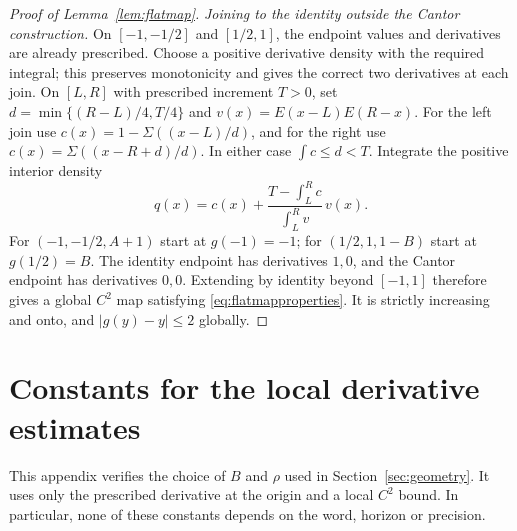 \documentclass[11pt]{amsart}
\theoremstyle{definition}
\theoremstyle{remark}
\numberwithin{equation}{section}
\begin{document}
\begin{proof}[Proof of Lemma~\ref{lem:flatmap}]
\smallskip
\emph{Joining to the identity outside the Cantor construction.}
On $[-1,-1/2]$ and $[1/2,1]$, the endpoint values and derivatives
are already prescribed. Choose a positive derivative density with
the required integral; this preserves monotonicity and gives the
correct two derivatives at each join. On $[L,R]$
with prescribed increment $T>0$, set
$d=\min\{(R-L)/4,T/4\}$ and $v(x)=E(x-L)E(R-x)$.
For the left join use $c(x)=1-\Sigma((x-L)/d)$, and for the right
use $c(x)=\Sigma((x-R+d)/d)$. In either case $\int c\le d<T$.
Integrate the positive interior density
\begin{equation}\label{eq:extensiondensity}
q(x)=c(x)+\frac{T-\int_L^R c}{\int_L^R v}\,v(x).
\end{equation}
For $(-1,-1/2,A+1)$ start at $g(-1)=-1$; for
$(1/2,1,1-B)$ start at $g(1/2)=B$.
The identity endpoint has derivatives $1,0$, and the Cantor endpoint
has derivatives $0,0$. Extending by identity beyond $[-1,1]$
therefore gives a global $C^2$ map satisfying
\eqref{eq:flatmapproperties}. It is strictly increasing and onto,
and $|g(y)-y|\le2$ globally.

\end{proof}

\section{Constants for the local derivative estimates}
\label{app:localconstants}
This appendix verifies the choice of $B$ and $\rho$ used in
Section~\ref{sec:geometry}. It uses only the prescribed derivative
at the origin and a local $C^2$ bound. In particular, none of these
constants depends on the word, horizon or precision.
\end{document}
